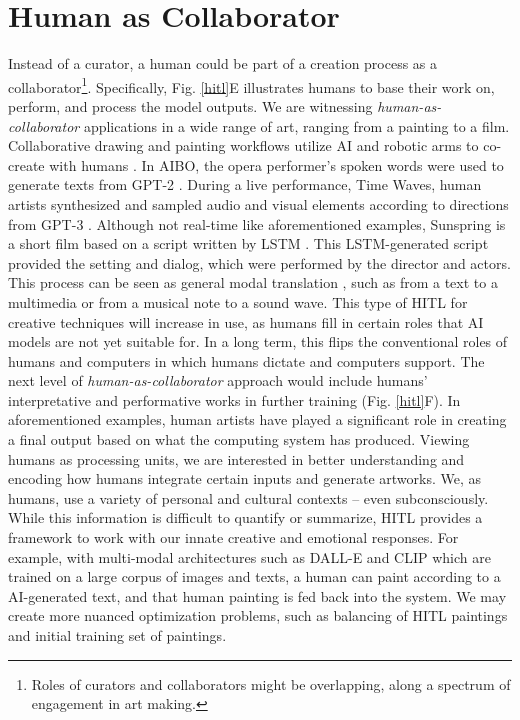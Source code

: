 \documentclass[letterpaper]{article} %
\begin{document}
\vspace{-3.42mm}
\section{Human as Collaborator}

Instead of a curator, a human could be part of a creation process as a collaborator\footnote{Roles of curators and collaborators might be overlapping, along a spectrum of engagement in art making.}. Specifically, Fig. \ref{hitl}E illustrates humans to base their work on, perform, and process the model outputs. We are witnessing \emph{human-as-collaborator} applications in a wide range of art, ranging from a painting to a film. Collaborative drawing and painting workflows utilize AI and robotic arms to co-create with humans \cite{Jansen2021}. In AIBO, the opera performer's spoken words were used to generate texts from GPT-2 \cite{Pearlman2021}. During a live performance, Time Waves, human artists synthesized and sampled audio and visual elements according to directions from GPT-3 \cite{TimeWaves}. Although not real-time like aforementioned examples, Sunspring \cite{Sunspring} is a short film based on a script written by LSTM \cite{Hochreiter1997}. This LSTM-generated script provided the setting and dialog, which were performed by the director and actors. This process can be seen as general modal translation \cite{Specia2016}, such as from a text to a multimedia or from a musical note to a sound wave. This type of HITL for creative techniques will increase in use, as humans fill in certain roles that AI models are not yet suitable for. In a long term, this flips the conventional roles of humans and computers in which humans dictate and computers support.  The next level of \emph{human-as-collaborator} approach would include humans' interpretative and performative works in further training (Fig. \ref{hitl}F). In aforementioned examples, human artists have played a significant role in creating a final output based on what the computing system has produced. Viewing humans as processing units, we are interested in better understanding and encoding how humans integrate certain inputs and generate artworks. We, as humans, use a variety of personal and cultural contexts -- even subconsciously. While this information is difficult to quantify or summarize, HITL provides a framework to work with our innate creative and emotional responses. For example, with multi-modal architectures such as DALL-E \cite{Ramesh2021} and CLIP \cite{Radford2021} which are trained on a large corpus of images and texts, a human can paint according to a AI-generated text, and that human painting is fed back into the system. We may create more nuanced optimization problems, such as balancing of HITL paintings and initial training set of paintings.
\end{document}
